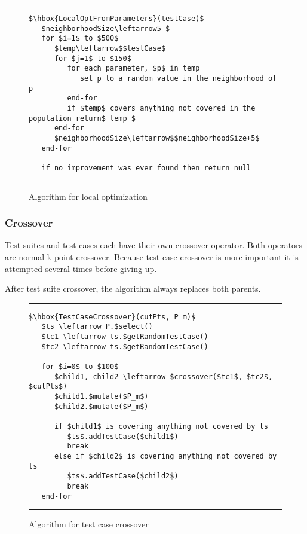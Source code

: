 \documentclass[runningheads]{llncs}
\begin{document}
\begin{figure}[h!]
\begin{center}
\hrule
\medskip
\begin{Verbatim}[fontfamily=tt, xleftmargin=10pt, commandchars=\\\{\},
        codes={\catcode`$=3\catcode`^=7\catcode`_=8}]
$\hbox{LocalOptFromParameters}(testCase)$
   $neighborhoodSize\leftarrow5 $
   for $i=1$ to $500$ 
      $temp\leftarrow$$testCase$
      for $j=1$ to $150$
         for each parameter, $p$ in temp
            set p to a random value in the neighborhood of p
         end-for     
         if $temp$ covers anything not covered in the population return$ temp $
      end-for
      $neighborhoodSize\leftarrow$$neighborhoodSize+5$
   end-for
   
   if no improvement was ever found then return null
\end{Verbatim}
\hrule
\end{center}
\caption{Algorithm for local optimization \label{fig:lcOptFP}}
\end{figure}

\FloatBarrier
\subsubsection{Crossover}
Test suites and test cases each have their own crossover operator. Both operators are normal k-point crossover. Because test case crossover is more important it is attempted several times before giving up.

After test suite crossover, the algorithm always replaces both parents. 

\begin{figure}[h!]
\begin{center}
\hrule
\medskip
\begin{Verbatim}[fontfamily=tt, xleftmargin=10pt, commandchars=\\\{\},
        codes={\catcode`$=3\catcode`^=7\catcode`_=8}]
$\hbox{TestCaseCrossover}(cutPts, P_m)$  
   $ts \leftarrow P.$select()
   $tc1 \leftarrow ts.$getRandomTestCase()
   $tc2 \leftarrow ts.$getRandomTestCase()
   
   for $i=0$ to $100$
      $child1, child2 \leftarrow $crossover($tc1$, $tc2$, $cutPts$)
      $child1.$mutate($P_m$)
      $child2.$mutate($P_m$)
      
      if $child1$ is covering anything not covered by ts
         $ts$.addTestCase($child1$)
         break
      else if $child2$ is covering anything not covered by ts
         $ts$.addTestCase($child2$)
         break
   end-for
\end{Verbatim}
\hrule
\end{center}
\caption{Algorithm for test case crossover \label{fig:tcCrossAlt}}
\end{figure}
\end{document}
